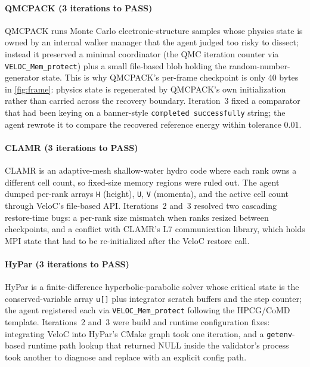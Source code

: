 \documentclass[conference]{IEEEtran}
\begin{document}
\paragraph{QMCPACK (3 iterations to PASS)}
QMCPACK runs Monte Carlo electronic-structure samples whose physics state is owned by an internal walker manager that the agent judged too risky to dissect; instead it preserved a minimal coordinator (the QMC iteration counter via \texttt{VELOC\_Mem\_protect}) plus a small file-based blob holding the random-number-generator state. This is why QMCPACK's per-frame checkpoint is only 40 bytes in \autoref{fig:frame}: physics state is regenerated by QMCPACK's own initialization rather than carried across the recovery boundary. Iteration~3 fixed a comparator that had been keying on a banner-style \texttt{completed successfully} string; the agent rewrote it to compare the recovered reference energy within tolerance \(0.01\).

\paragraph{CLAMR (3 iterations to PASS)}
CLAMR is an adaptive-mesh shallow-water hydro code where each rank owns a different cell count, so fixed-size memory regions were ruled out. The agent dumped per-rank arrays \texttt{H} (height), \texttt{U}, \texttt{V} (momenta), and the active cell count through VeloC's file-based API. Iterations~2 and~3 resolved two cascading restore-time bugs: a per-rank size mismatch when ranks resized between checkpoints, and a conflict with CLAMR's L7 communication library, which holds MPI state that had to be re-initialized after the VeloC restore call.

\paragraph{HyPar (3 iterations to PASS)}
HyPar is a finite-difference hyperbolic-parabolic solver whose critical state is the conserved-variable array \texttt{u[]} plus integrator scratch buffers and the step counter; the agent registered each via \texttt{VELOC\_Mem\_protect} following the HPCG/CoMD template. Iterations~2 and~3 were build and runtime configuration fixes: integrating VeloC into HyPar's CMake graph took one iteration, and a \texttt{getenv}-based runtime path lookup that returned NULL inside the validator's process took another to diagnose and replace with an explicit config path.
\end{document}
